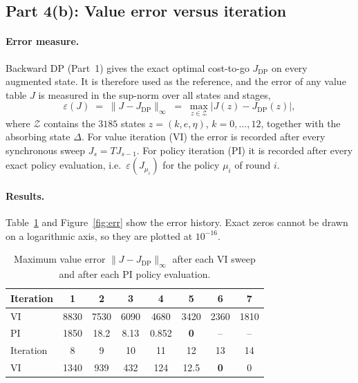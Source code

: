 \documentclass[11pt]{article}
\begin{document}
\subsection*{Part 4(b): Value error versus iteration}

\paragraph{Error measure.}
Backward DP (Part~1) gives the exact optimal cost-to-go $J_{\mathrm{DP}}$ on every
augmented state. It is therefore used as the reference, and the error of any value
table $J$ is measured in the sup-norm over all states and stages,
\begin{equation}
  \varepsilon(J) \;=\; \lVert J - J_{\mathrm{DP}} \rVert_\infty
  \;=\; \max_{z \in \mathcal{Z}} \bigl| J(z) - J_{\mathrm{DP}}(z) \bigr| ,
\end{equation}
where $\mathcal{Z}$ contains the $3185$ states $z=(k,e,\eta)$, $k=0,\dots,12$, together
with the absorbing state $\Delta$. For value iteration (VI) the error is recorded after
every synchronous sweep $J_{s}=TJ_{s-1}$. For policy iteration (PI) it is recorded
after every exact policy evaluation, i.e.\ $\varepsilon(J_{\mu_i})$ for the policy
$\mu_i$ of round $i$.

\paragraph{Results.}
Table~\ref{tab:err} and Figure~\ref{fig:err} show the error history. Exact zeros
cannot be drawn on a logarithmic axis, so they are plotted at $10^{-16}$.

\begin{table}[H]
\centering
\small
\begin{tabular}{l*{7}{c}}
\toprule
Iteration & 1 & 2 & 3 & 4 & 5 & 6 & 7 \\
\midrule
VI & 8830 & 7530 & 6090 & 4680 & 3420 & 2360 & 1810 \\
PI & 1850 & 18.2 & 8.13 & 0.852 & \textbf{0} & -- & -- \\
\midrule
Iteration & 8 & 9 & 10 & 11 & 12 & 13 & 14 \\
\midrule
VI & 1340 & 939 & 432 & 124 & 12.5 & \textbf{0} & 0 \\
\bottomrule
\end{tabular}
\caption{Maximum value error $\lVert J - J_{\mathrm{DP}}\rVert_\infty$ after each VI
sweep and after each PI policy evaluation.}
\label{tab:err}
\end{table}
\end{document}
